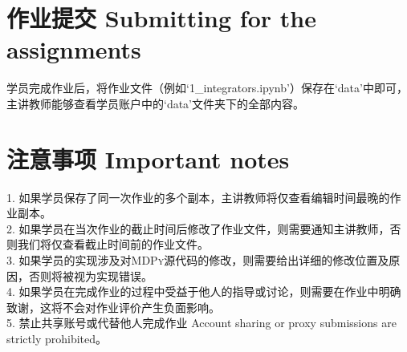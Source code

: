 \documentclass{article}
\begin{document}
\section*{作业提交 Submitting for the assignments}

学员完成作业后，将作业文件（例如`1\_integrators.ipynb'）保存在`data'中即可，主讲教师能够查看学员账户中的`data'文件夹下的全部内容。

\section*{注意事项 Important notes}

1. 如果学员保存了同一次作业的多个副本，主讲教师将仅查看编辑时间最晚的作业副本。\\
2. 如果学员在当次作业的截止时间后修改了作业文件，则需要通知主讲教师，否则我们将仅查看截止时间前的作业文件。\\
3. 如果学员的实现涉及对\textsc{MDPy}源代码的修改，则需要给出详细的修改位置及原因，否则将被视为实现错误。\\
4. 如果学员在完成作业的过程中受益于他人的指导或讨论，则需要在作业中明确致谢，这将不会对作业评价产生负面影响。\\
5. 禁止共享账号或代替他人完成作业 Account sharing or proxy submissions are strictly prohibited。
\end{document}
